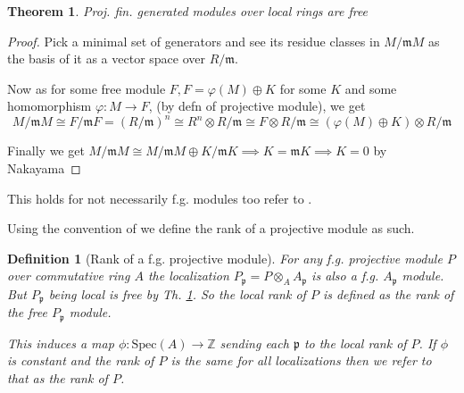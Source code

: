 \documentclass[12pt]{article}
\numberwithin{equation}{section}
\newcommand{\Z}{\mathbb{Z}}
\newcounter{dummy} \numberwithin{dummy}{section}
\newtheorem{theorem}[dummy]{Theorem}
\newtheorem{definition}[dummy]{Definition}
\begin{document}
	\begin{theorem}\label{a2}Proj. fin. generated modules over local rings are free
	\end{theorem}
	\begin{proof}
		Pick a minimal set of generators and see its residue classes in $M/\mathfrak{m}M$ as the basis of it as a vector space over $R/\mathfrak{m}$.
		
		Now as for some free module $F, F=\varphi(M)\oplus K$ for some $K$ and some homomorphism $\varphi: M \to F$, (by defn of projective module), 	we get \[ M/\mathfrak{m}M \cong 	F/\mathfrak{m}F = (R/\mathfrak{m})^n\cong R^n\otimes R/\mathfrak{m} \cong F \otimes R/\mathfrak{m} \cong (\varphi(M)\oplus K) \otimes R/\mathfrak{m}\]
		
		Finally we get $M/\mathfrak{m}M \cong M/\mathfrak{m}M \oplus K/\mathfrak{m}K\implies K=\mathfrak{m}K \implies K=0$ by Nakayama
	\end{proof}
	This holds for not necessarily f.g. modules too refer to \cite[Th.~2.5]{matsumura_1987}	.
	
	Using the convention of \cite{lam1999lectures} we define the rank of a projective module as such.
	\begin{definition}[Rank of a f.g. projective module]\label{def:rankproj}
		For any f.g. projective module $P$ over commutative ring $A$ the localization $P_\mathfrak{p} =P \otimes_A A_\mathfrak{p}$ is also a f.g. $A_\mathfrak{p}$ module. But $P_\mathfrak{p}$ being local is free by Th. \ref{a2}. So the local rank of $P$ is defined as the rank of the free $P_\mathfrak{p} $ module.
		
		This induces a map $\phi: \mathrm{Spec}(A) \to \Z $ sending each $\mathfrak{p}$ to the local rank of $P$. If $\phi $ is constant and the rank of $P$ is the same for all localizations then we refer to that as the rank of $P$.
	\end{definition}
	
\end{document}
